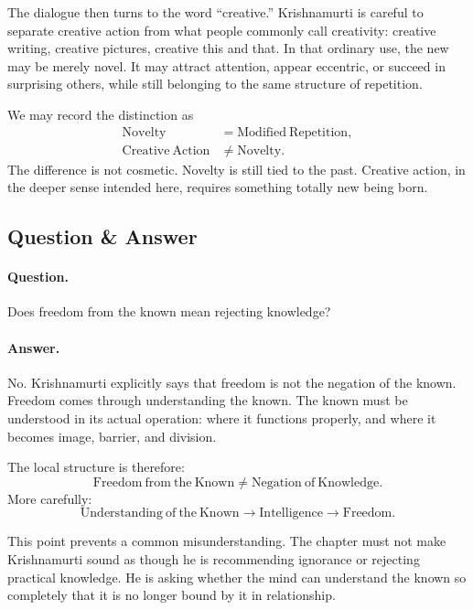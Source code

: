 The dialogue then turns to the word ``creative.'' Krishnamurti is careful to separate creative action from what people commonly call creativity: creative writing, creative pictures, creative this and that. In that ordinary use, the new may be merely novel. It may attract attention, appear eccentric, or succeed in surprising others, while still belonging to the same structure of repetition.

We may record the distinction as
\begin{align}
\mathrm{Novelty} &= \mathrm{Modified\ Repetition},\\
\mathrm{Creative\ Action} &\neq \mathrm{Novelty}.
\end{align}
The difference is not cosmetic. Novelty is still tied to the past. Creative action, in the deeper sense intended here, requires something totally new being born.

\subsection{Question \& Answer}

\paragraph{Question.}
Does freedom from the known mean rejecting knowledge?

\paragraph{Answer.}
No. Krishnamurti explicitly says that freedom is not the negation of the known. Freedom comes through understanding the known. The known must be understood in its actual operation: where it functions properly, and where it becomes image, barrier, and division.

The local structure is therefore:
\begin{equation}
\mathrm{Freedom\ from\ the\ Known}
\neq
\mathrm{Negation\ of\ Knowledge}.
\end{equation}
More carefully:
\begin{equation}
\mathrm{Understanding\ of\ the\ Known}
\longrightarrow
\mathrm{Intelligence}
\longrightarrow
\mathrm{Freedom}.
\end{equation}

This point prevents a common misunderstanding. The chapter must not make Krishnamurti sound as though he is recommending ignorance or rejecting practical knowledge. He is asking whether the mind can understand the known so completely that it is no longer bound by it in relationship.

